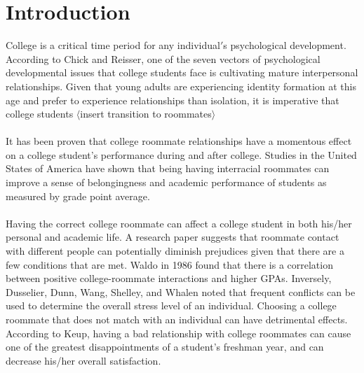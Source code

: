 \documentclass[journal]{./IEEE/IEEEtran}
\begin{document}
\section{Introduction}
    College is a critical time period for any individual$'$s psychological development\cite{erb}. According to Chick and Reisser, one of the seven vectors of psychological developmental issues that college students face is cultivating mature interpersonal relationships\cite{chickering}. Given that young adults are experiencing identity formation at this age and prefer to experience relationships than isolation, it is imperative that college students $\langle$insert transition to roommates$\rangle$
    \\
    \\
    It has been proven that college roommate relationships have a momentous effect on a college student’s performance during and after college. Studies in the United States of America have shown that being having interracial roommates can improve a sense of belongingness and academic performance of students as measured by grade point average\cite{shook}.
    \\
    \\
    Having the correct college roommate can affect a college student in both his/her personal and academic life. A research paper suggests that roommate contact with different people can potentially diminish prejudices given that there are a few conditions that are met. Waldo in 1986 found that there is a correlation between positive college-roommate interactions and higher GPAs. Inversely, Dusselier, Dunn, Wang, Shelley, and Whalen noted that frequent conflicts can be used to determine the overall stress level of an individual\cite{dusselier}. Choosing a college roommate that does not match with an individual can have detrimental effects. According to Keup, having a bad relationship with college roommates can cause one of the greatest disappointments of a student’s freshman year, and can decrease his/her overall satisfaction\cite{keup}.
    \\
    \\
\end{document}
